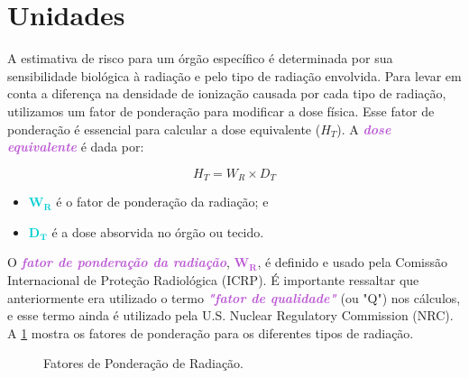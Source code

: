 \documentclass[11pt,a4paper]{article}
\newcounter{exemplo}
\begin{document}
\section{Unidades}

	A estimativa de risco para um órgão específico é determinada por sua sensibilidade biológica à radiação e pelo tipo de radiação envolvida. Para levar em conta a diferença na densidade de ionização causada por cada tipo de radiação, utilizamos um fator de ponderação para modificar a dose física. Esse fator de ponderação é essencial para calcular a dose equivalente ($H_T$). A \textcolor{MediumOrchid}{\textbf{\textit{dose equivalente}}} é dada por:
	
		\begin{equation}
			H_T = W_R \times D_T
		\end{equation}

		\begin{exemplo}[onde,]
			\begin{itemize}
				\item \textcolor{DarkTurquoise}{$\mathbf{W_R}$} é o fator de ponderação da radiação; e
				\item \textcolor{DarkTurquoise}{$\mathbf{D_T}$} é a dose absorvida no órgão ou tecido.
			\end{itemize}
		\end{exemplo}

	O \textcolor{MediumOrchid}{\textbf{\textit{fator de ponderação da radiação}}}, \textcolor{MediumOrchid}{$\mathbf{W_R}$}, é definido e usado pela Comissão Internacional de Proteção Radiológica (ICRP). É importante ressaltar que anteriormente era utilizado o termo \textcolor{MediumOrchid}{\textbf{\textit{"fator de qualidade"}}} (ou "Q") nos cálculos, e esse termo ainda é utilizado pela U.S. Nuclear Regulatory Commission (NRC). A \ref{fig:prFatorPesoRadiacao} mostra os fatores de ponderação para os diferentes tipos de radiação. 

		\begin{figure}[!h]
			\centering
			\caption{Fatores de Ponderação de Radiação.}
			\label{fig:prFatorPesoRadiacao}
		\end{figure}
	
\end{document}
